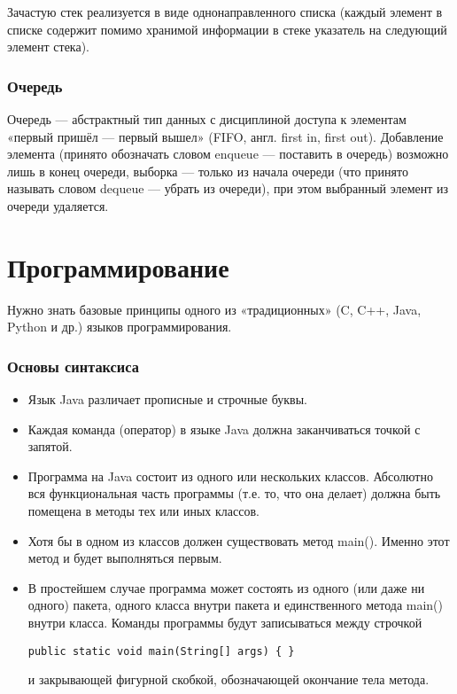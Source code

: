 \documentclass[12pt]{matmex-diploma}
\begin{document}
            Зачастую стек реализуется в виде однонаправленного списка (каждый элемент в списке содержит помимо хранимой информации в стеке указатель на следующий элемент стека).
            
        \subsubsection*{Очередь}
            Очередь — абстрактный тип данных с дисциплиной доступа к элементам «первый пришёл — первый вышел» (FIFO, англ. first in, first out). Добавление элемента (принято обозначать словом enqueue — поставить в очередь) возможно лишь в конец очереди, выборка — только из начала очереди (что принято называть словом dequeue — убрать из очереди), при этом выбранный элемент из очереди удаляется.
            
\section{Программирование}     

    Нужно знать базовые принципы одного из «традиционных» (C, C++, Java, Python и др.) языков программирования.
    
    \subsubsection*{Основы синтаксиса}
        \begin{itemize}
            \item Язык Java различает прописные и строчные буквы.
            \item Каждая команда (оператор) в языке Java должна заканчиваться точкой с запятой.
            \item Программа на Java состоит из одного или нескольких классов. Абсолютно вся функциональная часть программы (т.е. то, что она делает) должна быть помещена в методы тех или иных классов.
            \item Хотя бы в одном из классов должен существовать метод main(). Именно этот метод и будет выполняться первым.
            \item В простейшем случае программа может состоять из одного (или даже ни одного) пакета, одного класса внутри пакета и единственного метода main() внутри класса. Команды программы будут записываться между строчкой         \begin{verbatim}
public static void main(String[] args) { }
		        \end{verbatim} 
		        и закрывающей фигурной скобкой, обозначающей окончание тела метода.
        \end{itemize}
\end{document}
